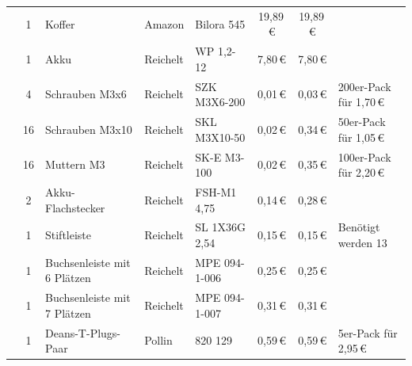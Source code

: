 \documentclass[paper=a4, parskip, numbers=noenddot, toc=listof, headsepline]{scrbook}
\begin{document}
{\begin{longtable}{p{1.2cm}cp{2.5cm}llSSp{2.35cm}}
				                                        & 1    & Koffer                                    & Amazon     & Bilora 545                                                                 & 19,89\,€ & 19,89\,€ &                           \\
				                                        & 1    & Akku                                      & Reichelt   & WP 1,2-12                                                                  & 7,80\,€  & 7,80\,€  &                           \\
				                                        & 4    & Schrauben M3x6                            & Reichelt   & SZK M3X6-200                                                               & 0,01\,€  & 0,03\,€  & 200er-Pack für 1,70\,€ \\
				                                        & 16   & Schrauben M3x10                           & Reichelt   & SKL M3X10-50                                                               & 0,02\,€  & 0,34\,€  & 50er-Pack für 1,05\,€  \\
				                                        & 16   & Muttern M3                                & Reichelt   & SK-E M3-100                                                                & 0,02\,€  & 0,35\,€  & 100er-Pack für 2,20\,€ \\
				                                        & 2    & Akku-Flachstecker                         & Reichelt   & FSH-M1 4,75                                                                & 0,14\,€  & 0,28\,€  &                           \\
				                                        & 1    & Stiftleiste                               & Reichelt   & SL 1X36G 2,54                                                              & 0,15\,€  & 0,15\,€  & Benötigt werden 13       \\
				                                        & 1    & Buchsenleiste mit 6 Plätzen              & Reichelt   & MPE 094-1-006                                                              & 0,25\,€  & 0,25\,€  &                           \\
				                                        & 1    & Buchsenleiste mit 7 Plätzen              & Reichelt   & MPE 094-1-007                                                              & 0,31\,€  & 0,31\,€  &                           \\
				                                        & 1    & Deans-T-Plugs-Paar                        & Pollin     & 820 129                                                                    & 0,59\,€  & 0,59\,€  & 5er-Pack für 2,95\,€   \\

\end{longtable}}
\end{document}
